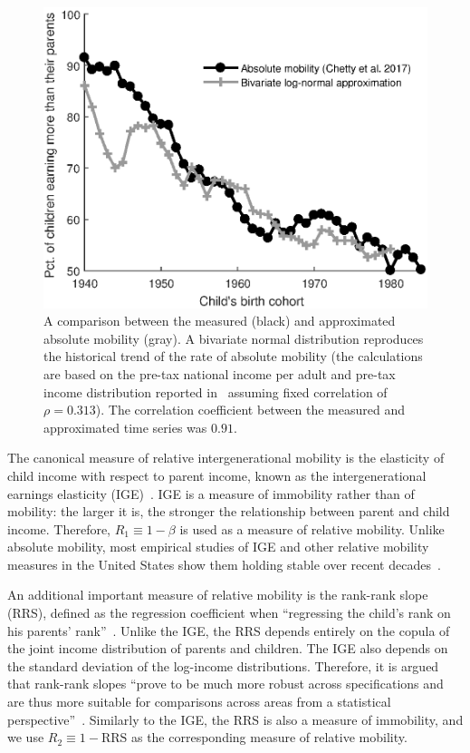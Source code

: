 \documentclass[12pt]{article}
\newcommand{\flabel}[1]{\label{fig:#1}}
\numberwithin{equation}{section}
\begin{document}
\begin{figure}[!htb]
\centering
\includegraphics[width=1.0\textwidth] {./figs/trend2.eps}
\caption{A comparison between the measured (black) and approximated absolute mobility (gray). A bivariate normal distribution reproduces the historical trend of the rate of absolute mobility (the calculations are based on the pre-tax national income per adult and pre-tax income distribution reported in~\citet{WID2017} assuming fixed correlation of $\rho=0.313$). The correlation coefficient between the measured and approximated time series was $0.91$.}
\flabel{trend}
\end{figure}

The canonical measure of relative intergenerational mobility is the elasticity of child income with respect to parent income, known as the intergenerational earnings elasticity (IGE)~\citep{mulligan1997parental,lee2009trends,chetty2014land}. IGE is a measure of immobility rather than of mobility: the larger it is, the stronger the relationship between parent and child income. Therefore, $R_1 \equiv 1-\beta$ is used as a measure of relative mobility. Unlike absolute mobility, most empirical studies of IGE and other relative mobility measures in the United States show them holding stable over recent decades~\citep{lee2009trends,hauser2010intergenerational,chetty2014land,chetty2014united}. 

An additional important measure of relative mobility is the rank-rank slope (RRS), defined as the regression coefficient when ``regressing the child's rank on his parents' rank''~\citep[p.~1561]{chetty2014land}. Unlike the IGE, the RRS depends entirely on the copula of the joint income distribution of parents and children. The IGE also depends on the standard deviation of the log-income distributions. Therefore, it is argued that rank-rank slopes ``prove to be much more robust across specifications and are thus more suitable for comparisons across areas from a statistical perspective''~\citep[p.~1561]{chetty2014land}. Similarly to the IGE, the RRS is also a measure of immobility, and we use $R_2 \equiv 1-\text{RRS}$ as the corresponding measure of relative mobility.
\end{document}
